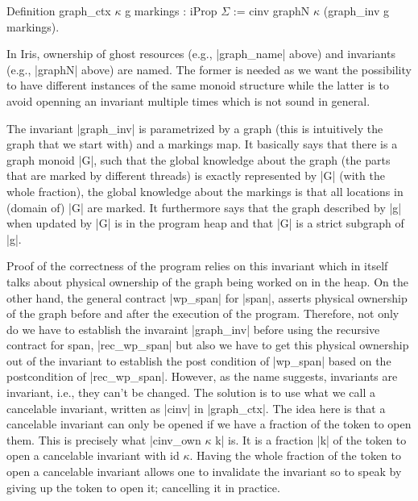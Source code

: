 \documentclass[]{scrartcl}
\begin{document}
\begin{Coq}
Definition graph_ctx $\kappa$ g markings : iProp $\Sigma$ := 
  cinv graphN $\kappa$ (graph_inv g markings).
\end{Coq}

In Iris, ownership of ghost resources (e.g., \Coqe|graph_name| above) and invariants (e.g., \Coqe|graphN| above) are named.
The former is needed as we want the possibility to have different
instances of the same monoid structure while the latter is to avoid
openning an invariant multiple times which is not sound in general.

The invariant \Coqe|graph_inv| is parametrized by a graph (this is
intuitively the graph that we start with) and a markings map.
It basically says that there is a graph monoid \Coqe|G|,
such that the global knowledge about the graph (the parts that are
marked by different threads) is exactly represented by \Coqe|G| (with the whole fraction), the global knowledge about the markings is that all
locations in (domain of) \Coqe|G| are marked.
It furthermore says that the graph described by \Coqe|g| when updated
by \Coqe|G| is in the program heap and that \Coqe|G| is a strict subgraph
of \Coqe|g|.

Proof of the correctness of the program relies on this invariant which
in itself talks about physical ownership of the graph being worked on
in the heap.
On the other hand, the general contract \Coqe|wp_span| for \Coqe|span|, 
asserts physical ownership of the graph before and after the execution of
the program.
Therefore, not only do we have to establish the invaraint \Coqe|graph_inv| before using the recursive contract for span, \Coqe|rec_wp_span|
but also we have to get this physical ownership out of the invariant to
establish the post condition of \Coqe|wp_span| based on the postcondition
of \Coqe|rec_wp_span|.
However, as the name suggests, invariants are invariant, i.e., they can't
be changed.
The solution is to use what we call a cancelable invariant, written as
\Coqe|cinv| in \Coqe|graph_ctx|.
The idea here is that a cancelable invariant can only be opened if we
have a fraction of the token to open them. This is precisely what
\Coqe|cinv_own $\kappa$ k| is. It is a fraction \Coqe|k| of the token
to open a cancelable invariant with id $\kappa$.
Having the whole fraction of the token to open a cancelable invariant
allows one to invalidate the invariant so to speak by giving up the
token to open it; cancelling it in practice.
\end{document}
